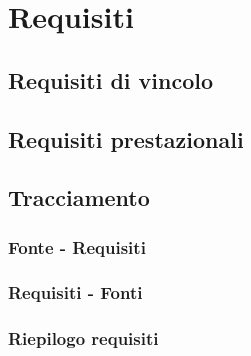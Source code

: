 \section{Requisiti}


\newpage

\subsection{Requisiti di vincolo}
\subsection{Requisiti prestazionali}
\subsection{Tracciamento}
\subsubsection{Fonte - Requisiti}
\subsubsection{Requisiti - Fonti}
\subsubsection{Riepilogo requisiti}
